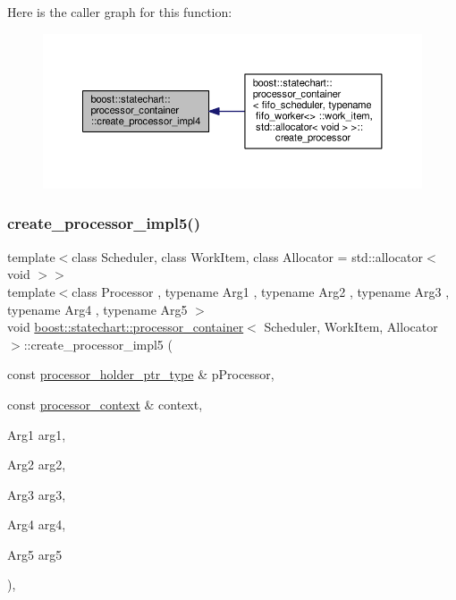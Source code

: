 Here is the caller graph for this function\+:
\nopagebreak
\begin{figure}[H]
\begin{center}
\leavevmode
\includegraphics[width=350pt]{classboost_1_1statechart_1_1processor__container_a4e8370ed263cc0a9546117e065744fac_icgraph}
\end{center}
\end{figure}
\mbox{\label{classboost_1_1statechart_1_1processor__container_a98a9336053bc06d3486464e98f997b64}} 
\subsubsection{\texorpdfstring{create\+\_\+processor\+\_\+impl5()}{create\_processor\_impl5()}}
{\footnotesize\ttfamily template$<$class Scheduler, class Work\+Item, class Allocator = std\+::allocator$<$ void $>$$>$ \\
template$<$class Processor , typename Arg1 , typename Arg2 , typename Arg3 , typename Arg4 , typename Arg5 $>$ \\
void \mbox{\hyperlink{classboost_1_1statechart_1_1processor__container}{boost\+::statechart\+::processor\+\_\+container}}$<$ Scheduler, Work\+Item, Allocator $>$\+::create\+\_\+processor\+\_\+impl5 (\begin{DoxyParamCaption}\item[{const \mbox{\hyperlink{classboost_1_1statechart_1_1processor__container_a885e5a42694857bfaa44ec053ed20a57}{processor\+\_\+holder\+\_\+ptr\+\_\+type}} \&}]{p\+Processor,  }\item[{const \mbox{\hyperlink{classboost_1_1statechart_1_1processor__container_1_1processor__context}{processor\+\_\+context}} \&}]{context,  }\item[{Arg1}]{arg1,  }\item[{Arg2}]{arg2,  }\item[{Arg3}]{arg3,  }\item[{Arg4}]{arg4,  }\item[{Arg5}]{arg5 }\end{DoxyParamCaption})\hspace{0.3cm}{\ttfamily [inline]}, {\ttfamily [private]}}

